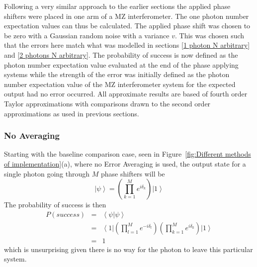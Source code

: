 \documentclass[aps,pra,twocolumn,superscriptaddress,numerical,floatfix]{revtex4-1}
\begin{document}
Following a very similar approach to the earlier sections the applied phase shifters were placed in one arm of a MZ interferometer. The one photon number expectation values can thus be calculated. The applied phase shift was chosen to be zero with a Gaussian random noise with a variance $v$. This was chosen such that the errors here match what was modelled in sections \ref{1 photon N arbitrary} and \ref{2 photons N arbitrary}. The probability of success is now defined as the photon number expectation value evaluated at the end of the phase applying systems while the strength of the error was initially defined as the photon number expectation value of the MZ interferometer system for the expected output had no error occurred. All approximate results are based of fourth order Taylor approximations with comparisons drawn to the second order approximations as used in previous sections.

\subsubsection{No Averaging\label{No Averaging}}

Starting with the baseline comparison case, seen in Figure~\ref{fig:Different methods of implementation}(a), where no Error Averaging is used, the output state for a single photon going through $M$ phase shifters will be
\begin{equation}
\left|\psi\right\rangle =\left(\prod_{k=1}^{M}e^{i\delta_{k}}\right)\left|1\right\rangle \label{eq:noAvPhaseState}
\end{equation}
The probability of success is then
\begin{eqnarray}
P\left(success\right) & = & \left\langle \psi|\psi\right\rangle \nonumber \\
& = & \left\langle 1\right|\left(\prod_{l=1}^{M}e^{-i\delta_{l}}\right)\left(\prod_{k=1}^{M}e^{i\delta_{k}}\right)\left|1\right\rangle \nonumber \\
& = & 1\label{eq:noAveProbSuccess}
\end{eqnarray}
which is unsurprising given there is no way for the photon to leave this particular system.
\end{document}
